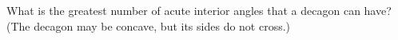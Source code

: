 What is the greatest number of acute interior angles that a decagon can have? (The decagon may be concave, but its sides do not cross.)
